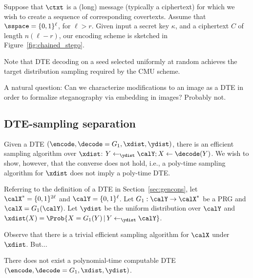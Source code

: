 Suppose that $\ctxt$ is a (long) message (typically a ciphertext) for which we wish to create a sequence of corresponding covertexts. Assume that $\sspace = \{0,1\}^{\ell}$, for $\ell > r$. Given input a secret key $\kappa$, and a ciphertext $C$ of length $n(\ell - r)$, our encoding scheme is sketched in Figure~\ref{fig:chained_stego}.

Note that DTE decoding on a seed selected uniformly at random achieves the target distribution sampling required by the CMU scheme.






A natural question: Can we characterize modifications to an image as a DTE in order to formalize steganography via embedding in images? Probably not.

\subsection{DTE-sampling separation}
Given a DTE $(\encode, \decode = G_1, \xdist, \ydist)$, there is an efficient sampling algorithm over $\xdist$: $Y \leftarrow_{\ydist} \calY; X \leftarrow \decode(Y)$. We wish to show, however, that the converse does not hold, i.e., a poly-time sampling algorithm for $\xdist$ does not imply a poly-time DTE.

Referring to the definition of a DTE in Section~\ref{sec:gencons}, let $\calX^* = \{0,1\}^{2\ell}$ and $\calY = \{0,1\}^{\ell}$.
Let $G_1: \calY \rightarrow \calX^*$ be a PRG and $\calX = G_1(\calY)$. Let $\ydist$ be the uniform distribution over $\calY$ and $\xdist(X) = \Prob{X = G_1(Y) \,|\, Y \leftarrow_{\ydist} \calY}$.

Observe that there is a trivial efficient sampling algorithm for $\calX$ under $\xdist$. But...

\begin{observation}
There does not exist a polynomial-time computable DTE $(\encode, \decode = G_1, \xdist, \ydist)$.
\end{observation}

